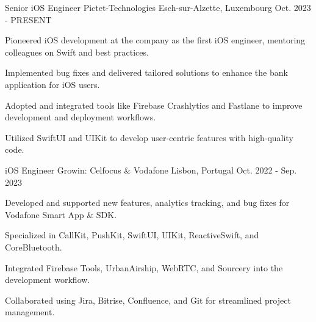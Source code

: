 
\begin{cventries}
  \cventry
    {Senior iOS Engineer} %
    {Pictet-Technologies} %
    {Esch-sur-Alzette, Luxembourg} %
    {Oct. 2023 - PRESENT} %
    {
    \begin{cvitems} %
      \item {Pioneered iOS development at the company as the first iOS engineer, mentoring colleagues on Swift and best practices.}
      \item {Implemented bug fixes and delivered tailored solutions to enhance the bank application for iOS users.}
      \item {Adopted and integrated tools like Firebase Crashlytics and Fastlane to improve development and deployment workflows.}
      \item {Utilized SwiftUI and UIKit to develop user-centric features with high-quality code.}
    \end{cvitems}
    }
  \cventry
    {iOS Engineer} %
    {Growin: Celfocus \& Vodafone} %
    {Lisbon, Portugal} %
    {Oct. 2022 - Sep. 2023} %
    {
    \begin{cvitems} %
      \item {Developed and supported new features, analytics tracking, and bug fixes for Vodafone Smart App \& SDK.}
      \item {Specialized in CallKit, PushKit, SwiftUI, UIKit, ReactiveSwift, and CoreBluetooth.}
      \item {Integrated Firebase Tools, UrbanAirship, WebRTC, and Sourcery into the development workflow.}
      \item {Collaborated using Jira, Bitrise, Confluence, and Git for streamlined project management.}
    \end{cvitems}
    }


\end{cventries}
